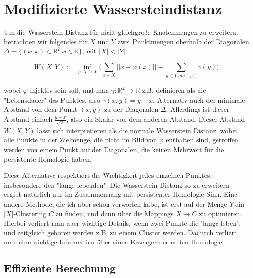 \documentclass[]{book}
\theoremstyle{definition}
\begin{document}
	
	\section*{Modifizierte Wassersteindistanz}
	
	Um die Wasserstein Distanz für nicht gleichgroße Knotenmengen zu erweitern, betrachten wir folgendes für $X$ und $Y$ zwei Punktmengen oberhalb der Diagonalen $\Delta=\{(x,x)\in\mathbb{R}^2 | x \in \mathbb{R}\}$, mit $|X|<|Y|$:
	
	$$W(X,Y):=\inf_{\varphi:X\hookrightarrow Y}\bigg(\sum_{x\in X}||x-\varphi(x)|| + \sum_{y\in Y\setminus im(\varphi)}\gamma(y) \bigg)$$
	
	wobei $\varphi$ injektiv sein soll, und man $\gamma:\mathbb{R}^2\rightarrow\mathbb{R}$ z.B. definieren als die "Lebensdauer" des Punktes, also $\gamma(x,y) = y-x$. Alternativ auch der minimale Abstand von dem Punkt $(x,y)$ zu der Diagonalen $\Delta$. Allerdings ist dieser Abstand einfach $\frac{y-x}{\sqrt{2}}$, also ein Skalar von dem anderen Abstand. Dieser Abstand $W(X,Y)$ lässt sich interpretieren als die normale Wasserstein Distanz, wobei alle Punkte in der Zielmenge, die nicht im Bild von $\varphi$ enthalten sind, getroffen werden von einem Punkt auf der Diagonalen, die keinen Mehrwert für die persistente Homologie haben.
	
	Diese Alternative respektiert die Wichtigkeit jedes einzelnen Punktes, insbesondere den "lange lebenden". Die Wasserstein Distanz so zu erweitern ergibt natürlich nur im Zusammenhang mit persistenter Homologie Sinn. Eine andere Methode, die ich aber schon verworfen habe, ist erst auf der Menge $Y$ ein $|X|$-Clustering $C$ zu finden, und dann über die Mappings $X\rightarrow C$ zu optimieren. Hierbei verliert man aber wichtige Details, wenn zwei Punkte die "lange leben", und zeitgleich geboren werden z.B. zu einem Cluster werden. Dadurch verliert man eine wichtige Information über einen Erzeuger der ersten Homologie.
	
	\subsection*{Effiziente Berechnung}
	
\end{document}
